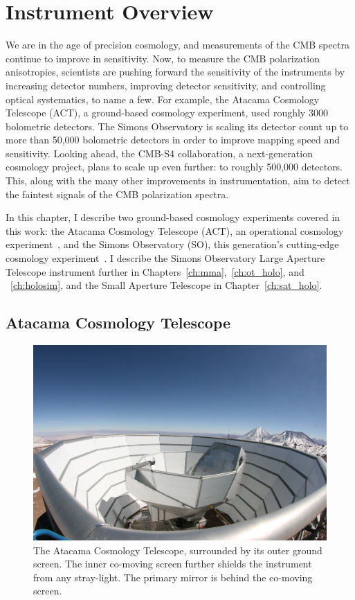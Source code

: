\chapter{Instrument Overview}
\label{ch:instruments}

We are in the age of precision cosmology, and measurements of the CMB spectra continue to improve in sensitivity.  Now, to measure the CMB polarization anisotropies, scientists are pushing forward the sensitivity of the instruments by increasing detector numbers, improving detector sensitivity, and controlling optical systematics, to name a few.  For example, the Atacama Cosmology Telescope (ACT), a ground-based cosmology experiment, used roughly 3000 bolometric detectors.  The Simons Observatory is scaling its detector count up to more than 50,000 bolometric detectors in order to improve mapping speed and sensitivity.  Looking ahead, the CMB-S4 collaboration, a next-generation cosmology project, plans to scale up even further: to roughly 500,000 detectors.  This, along with the many other improvements in instrumentation, aim to detect the faintest signals of the CMB polarization spectra.

In this chapter, I describe two ground-based cosmology experiments covered in this work: the Atacama Cosmology Telescope (ACT), an operational cosmology experiment~\cite{act_inst}, and the Simons Observatory (SO), this generation's cutting-edge cosmology experiment~\cite{so19}.  I describe the Simons Observatory Large Aperture Telescope instrument further in Chapters~\ref{ch:mma},~\ref{ch:ot_holo}, and ~\ref{ch:holosim}, and the Small Aperture Telescope in Chapter~\ref{ch:sat_holo}.

\section{Atacama Cosmology Telescope}

\begin{figure}[t]
    \centering
    \includegraphics[width = \textwidth]{Figures/act_inst_close.jpeg}
    \caption{The Atacama Cosmology Telescope, surrounded by its outer ground screen. The inner co-moving screen further shields the instrument from any stray-light.  The primary mirror is behind the co-moving screen.}
    \label{fig:act_site}
\end{figure}

